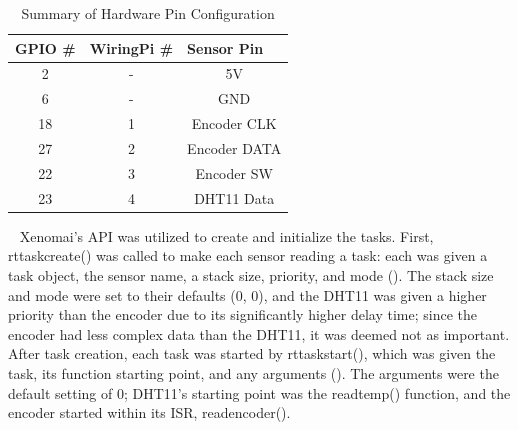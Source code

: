 \documentclass[letterpaper, 12pt]{article}
\begin{document}
\begin{table}[hbt]
	\centering
	\caption{Summary of Hardware Pin Configuration}
	\label{my-label}
	\begin{tabular}{|c|c|c|}
		\hline
		\multicolumn{1}{|l|}{GPIO \#} & \multicolumn{1}{l|}{WiringPi \#} & \multicolumn{1}{l|}{Sensor Pin} \\ \hline
		2                             & -                                & 5V                              \\ \hline
		6                             & -                                & GND                             \\ \hline
		18                            & 1                                & Encoder CLK                     \\ \hline
		27                            & 2                                & Encoder DATA                    \\ \hline
		22                            & 3                                & Encoder SW                      \\ \hline
		23                            & 4                                & DHT11 Data                      \\ \hline
	\end{tabular}
\end{table}

~\newline
\indent Xenomai's API was utilized to create and initialize the tasks.  First, rt\textunderscore task\textunderscore create() was called to make each sensor reading a task: each was given a task object, the sensor name, a stack size, priority, and mode (\cite{xenomai2018}).  The stack size and mode were set to their defaults (0, 0), and the DHT11 was given a higher priority than the encoder due to its significantly higher delay time; since the encoder had less complex data than the DHT11, it was deemed not as important.  After task creation, each task was started by rt\textunderscore task\textunderscore start(), which was given the task, its function starting point, and any arguments (\cite{xenomai2018}).  The arguments were the default setting of 0; DHT11's starting point was the read\textunderscore temp() function, and the encoder started within its ISR, read\textunderscore encoder().
\end{document}

